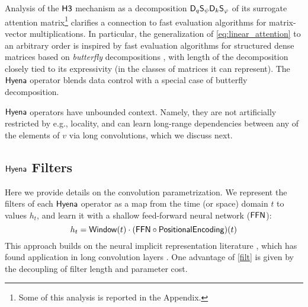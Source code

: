 %
Analysis of the $\sf H3$ mechanism as a decomposition $\mathsf{D}_q\mathsf{S}_\psi\mathsf{D}_k\mathsf{S}_\varphi$ of its surrogate attention matrix\footnote{Some of this analysis is reported in the Appendix.} clarifies a connection to fast evaluation algorithms for matrix-vector multiplications. In particular, the generalization of \eqref{eq:linear_attention} to an arbitrary order is inspired by fast evaluation algorithms for structured dense matrices based on \textit{butterfly} decompositions \citep{li2015butterfly,dao2019learning, dao2022monarch}, with length of the decomposition closely tied to its expressivity (in the classes of matrices it can represent). The ${\sf Hyena}$ operator blends data control with a special case of butterfly decomposition.         
%
\begin{remark}
${\sf Hyena}$ operators have unbounded context. Namely, they are not artificially restricted by e.g., locality, and can learn long-range dependencies between any of the elements of $v$ via long convolutions, which we discuss next.
\end{remark}
%
\subsection{${\sf Hyena}$ Filters}\label{hyena_ker}
%
Here we provide details on the convolution parametrization. We represent the filters of each ${\sf Hyena}$ operator as a map from the time (or space) domain $t$ to values $h_t$, and learn it with a shallow feed-forward neural network ({$\sf FFN$}):
%
\begin{equation}\label{filt}
    h_t = {\sf Window}(t)\cdot({\sf FFN} \circ {\sf PositionalEncoding}) (t)
\end{equation}
%
This approach builds on the neural implicit representation literature \citep{mildenhall2021nerf,sitzmann2020implicit}, which has found application in long convolution layers \citep{romero2021ckconv, romero2021flexconv}. One advantage of \eqref{filt} is given by the decoupling of filter length and parameter cost. 
%
